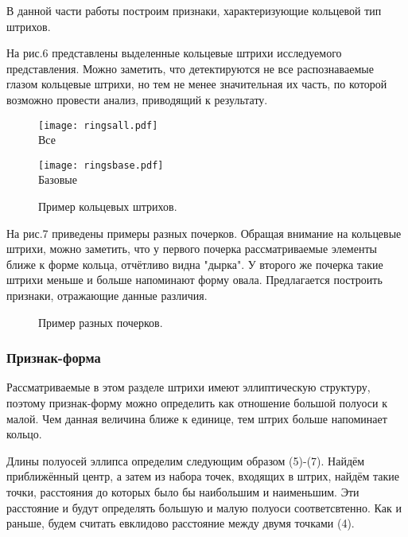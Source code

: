 \documentclass{article}
\begin{document}
В данной части работы построим признаки, характеризующие кольцевой тип штрихов. 

На рис.6 представлены выделенные кольцевые штрихи исследуемого представления. Можно заметить, что детектируются не все распознаваемые глазом кольцевые штрихи, но тем не менее значительная их часть, по которой возможно провести анализ, приводящий к результату.

\begin{figure}[h]
\begin{minipage}[h]{0.47\linewidth}
    \centering
    \texttt{[image: ringsall.pdf]} \\Все
\end{minipage}
\hfill
\begin{minipage}[h]{0.47\linewidth} 
    \centering
    \texttt{[image: ringsbase.pdf]} \\Базовые
\end{minipage}
\caption{Пример кольцевых штрихов.}
\end{figure}

На рис.7 приведены примеры разных почерков. Обращая внимание на кольцевые штрихи, можно заметить, что у первого почерка рассматриваемые элементы ближе к форме кольца, отчётливо видна "дырка". У второго же почерка такие штрихи меньше и больше напоминают форму овала. Предлагается построить признаки, отражающие данные различия. 

\begin{figure}[h]
\begin{minipage}[h]{1\linewidth}
\end{minipage}
\vfill
\begin{minipage}[h]{1\linewidth}
\end{minipage}
\caption{Пример разных почерков.}
\end{figure}

\subsubsection{Признак-форма}
Рассматриваемые в этом разделе штрихи имеют эллиптическую структуру, поэтому 
признак-форму можно определить как отношение большой полуоси к малой. Чем данная величина ближе к единице, тем штрих больше напоминает кольцо.

Длины полуосей эллипса определим следующим образом (5)-(7). Найдём приближённый центр, а затем из набора точек, входящих в штрих, найдём такие точки, расстояния до которых было бы наибольшим и наименьшим. Эти расстояние и будут определять большую и малую полуоси соответсвтенно. Как и раньше, будем считать евклидово расстояние между двумя точками (4).
\end{document}

